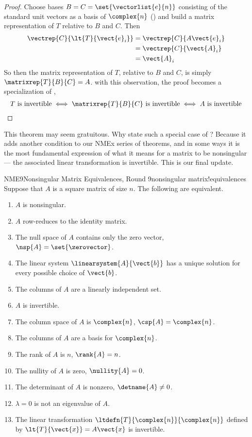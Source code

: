 \begin{proof}
Choose bases $B=C=\set{\vectorlist{e}{n}}$ consisting of the standard unit vectors as a basis of $\complex{n}$ () and build a matrix representation of $T$ relative to $B$ and $C$.  Then
%
\begin{align*}
\vectrep{C}{\lt{T}{\vect{e}_i}}
&=\vectrep{C}{A\vect{e}_i}\\
%
&=\vectrep{C}{\vect{A}_i}\\
%
&=\vect{A}_i
\end{align*}
%
So then the matrix representation of $T$, relative to $B$ and $C$, is simply $\matrixrep{T}{B}{C}=A$.  with this observation, the proof becomes a specialization of ,
%
\begin{align*}
%
T\text{ is invertible}
\iff\matrixrep{T}{B}{C}\text{ is invertible}
\iff A\text{ is invertible}
\end{align*}
%
\end{proof}
%
This theorem may seem gratuitous.  Why state such a special case of ?  Because it adds another condition to our NMEx series of theorems, and in some ways it is the most fundamental expression of what it means for a matrix to be nonsingular --- the associated linear transformation is invertible.  This is our final update.
%
\begin{theorem}{NME9}{Nonsingular Matrix Equivalences, Round 9}{nonsingular matrix!equivalences}
Suppose that $A$ is a square matrix of size $n$.  The following are equivalent.
%
\begin{enumerate}
\item $A$ is nonsingular.
\item $A$ row-reduces to the identity matrix.
\item The null space of $A$ contains only the zero vector, $\nsp{A}=\set{\zerovector}$.
\item The linear system $\linearsystem{A}{\vect{b}}$ has a unique solution for every possible choice of $\vect{b}$.
\item The columns of $A$ are a linearly independent set.
\item $A$ is invertible.
\item The column space of $A$ is $\complex{n}$, $\csp{A}=\complex{n}$.
\item The columns of $A$ are a basis for $\complex{n}$.
\item The rank of $A$ is $n$, $\rank{A}=n$.
\item The nullity of $A$ is zero, $\nullity{A}=0$.
\item The determinant of $A$ is nonzero, $\detname{A}\neq 0$.
\item $\lambda=0$ is not an eigenvalue of $A$.
\item The linear transformation $\ltdefn{T}{\complex{n}}{\complex{n}}$ defined by $\lt{T}{\vect{x}}=A\vect{x}$ is invertible.
\end{enumerate}
\end{theorem}
